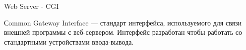 \begin{frame}[fragile]{Web Server - CGI}
  \begin{center}
    Сommon Gateway Interface — стандарт интерфейса, используемого для связи внешней программы с веб-сервером.
    Интерфейс разработан чтобы работать со стандартными устройствами ввода-вывода.
  \end{center}
\end{frame}
